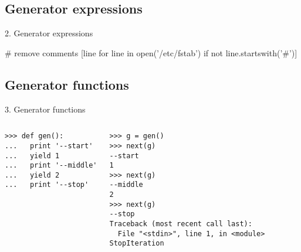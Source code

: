 \documentclass{beamer}
\begin{document}
\subsection{Generator expressions}

\begin{frame}[fragile]{2. Generator expressions}
  \begin{pycode}
    # remove comments
    [line for line in open('/etc/fstab')
     if not line.startswith('#')]
  \end{pycode}
\end{frame}


\subsection{Generator functions}
\begin{frame}[fragile]{3. Generator functions}
  \begin{columns}[t]
    \begin{verbatim}
>>> def gen():
...   print '--start'
...   yield 1
...   print '--middle'
...   yield 2
...   print '--stop'
    \end{verbatim}
    \pause
    \begin{verbatim}
>>> g = gen()
>>> next(g)
--start
1
>>> next(g)
--middle
2
>>> next(g)
--stop
Traceback (most recent call last):
  File "<stdin>", line 1, in <module>
StopIteration
    \end{verbatim}
  \end{columns}
\end{frame}
\end{document}
